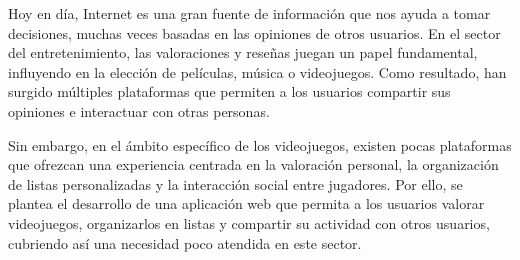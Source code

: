 Hoy en día, Internet es una gran fuente de información que nos ayuda a tomar decisiones, muchas veces basadas en las opiniones de otros usuarios. 
En el sector del entretenimiento, las valoraciones y reseñas juegan un papel fundamental, influyendo en la elección de películas, música o videojuegos. 
Como resultado, han surgido múltiples plataformas que permiten a los usuarios compartir sus opiniones e interactuar con otras personas.

Sin embargo, en el ámbito específico de los videojuegos, existen pocas plataformas que ofrezcan una experiencia centrada en la valoración personal, 
la organización de listas personalizadas y la interacción social entre jugadores. Por ello, se plantea el desarrollo de una aplicación web que permita 
a los usuarios valorar videojuegos, organizarlos en listas y compartir su actividad con otros usuarios, cubriendo así una necesidad poco atendida en este sector. 


